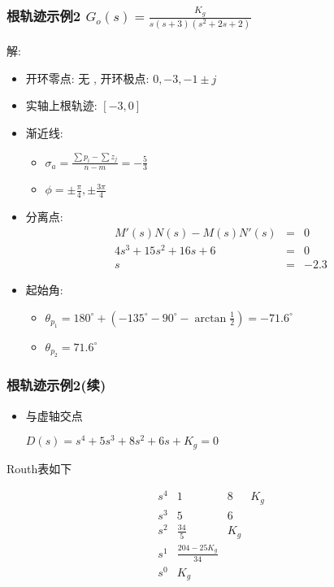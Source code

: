 \documentclass{beamer}
\begin{document}
\begin{frame}
\frametitle{根轨迹示例2 $G_o(s) = \frac{K_g}{s(s+3)(s^2+2s+2)}$}
\label{sec-2-5}


解:

\begin{itemize}
\item <2->开环零点: 无 , 开环极点: $0,-3,-1\pm j$
\item <3->实轴上根轨迹:  $[-3,0]$
\item <4->渐近线:
\begin{itemize}
\item $\sigma_a=\frac{\sum p_i-\sum z_j}{n-m}=-\frac{5}{3}$
\item $\phi=\pm\frac{\pi}{4},\pm\frac{3\pi}{4}$
\end{itemize}
\item <5->分离点: 
        \begin{eqnarray*}
        M'(s)N(s)-M(s)N'(s) &=& 0 \\
        4s^3+15s^2+16s+6 &= & 0 \\
        s &=& -2.3
        \end{eqnarray*}
\item <6->起始角:
\begin{itemize}
\item $\theta_{p_1}=180^{\circ}+(-135^{\circ}-90^{\circ}-\arctan\frac{1}{2})=-71.6^{\circ}$
\item $\theta_{p_2}=71.6^{\circ}$
\end{itemize}
\end{itemize}
\end{frame}
\begin{frame}
\frametitle{根轨迹示例2(续)}
\label{sec-2-6}

\begin{itemize}
\item 与虚轴交点           

       $D(s)=s^4+5s^3+8s^2+6s+K_g =0$
\end{itemize}
\begin{block}{Routh表如下}
\label{sec-2-6-1}

  
                \[\begin{matrix}
                 s^4 & 1 & 8 & K_g \\
                 s^3 & 5 & 6 \\
                 s^2 & \frac{34}{5} & K_g \\
                 s^1 & \frac{204-25K_g}{34} \\
                 s^0 & K_g
                \end{matrix}\]
\end{block}
\end{frame}
\end{document}
